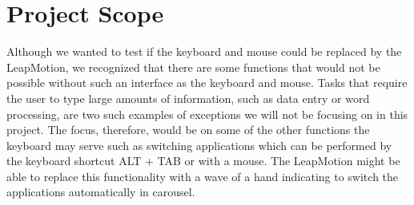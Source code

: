 \section{Project Scope}
Although we wanted to test if the keyboard and mouse could be replaced by the LeapMotion, we recognized that there are some functions that would not be possible without such an interface as the keyboard and mouse. 
Tasks that require the user to type large amounts of information, such as data entry or word processing, are two such examples of exceptions we will not be focusing on in this project. The focus, therefore, would be on some of the other functions the keyboard may serve such as switching applications which can be performed by the keyboard shortcut ALT + TAB or with a mouse. The LeapMotion might be able to replace this functionality with a wave of a hand indicating to switch the applications automatically in carousel. 
